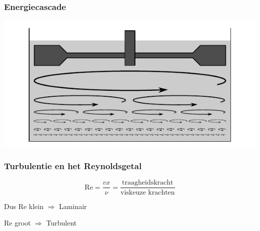 \documentclass[t]{beamer}
\begin{document}
  	\begin{frame}
		\frametitle{Energiecascade}
		\vspace{1cm}
		\center
		\includegraphics{fig/uitwendige_stroming/Energie_cascade}
  	\end{frame}
  	\begin{frame}
		\frametitle{Turbulentie en het Reynoldsgetal}
		\vspace{1cm}
		\begin{equation*}
			\text{Re} = \dfrac{v x}{\nu} = \dfrac{\text{traagheidskracht}}{\text{viskeuze krachten}}
		\end{equation*}
		
		\vspace{1cm}
		Dus
		\center
		\vspace{0.5cm}
		\pause
		Re klein $\Longrightarrow$ Laminair
		
		\vspace{0.5cm}
		\pause
		Re groot $\Longrightarrow$ Turbulent 
  	\end{frame}
\end{document}
